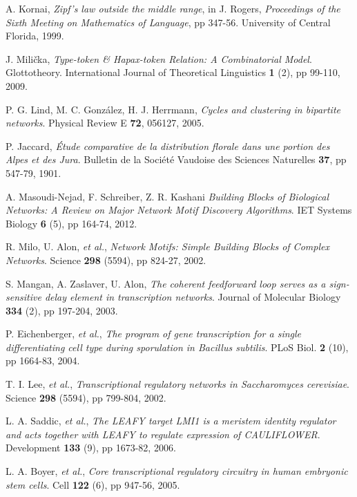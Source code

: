 \begin{thebibliography}{99}
  A. Kornai,
  \emph{Zipf's law outside the middle range}, in J. Rogers, \emph{Proceedings of the Sixth Meeting on Mathematics of Language}, pp 347-56.
  University of Central Florida,
  1999.

  J. Milička,
  \emph{Type-token \& Hapax-token Relation: A Combinatorial Model}.
  Glottotheory. International Journal of Theoretical Linguistics \textbf{1} (2), pp 99-110,
  2009.

  P. G. Lind, M. C. González, H. J. Herrmann,
  \emph{Cycles and clustering in bipartite networks}.
  Physical Review E \textbf{72}, 056127,
  2005.

  P. Jaccard,
  \emph{Étude comparative de la distribution florale dans une portion des Alpes et des Jura}.
  Bulletin de la Société Vaudoise des Sciences Naturelles \textbf{37}, pp 547-79,
  1901.

  A. Masoudi-Nejad, F. Schreiber, Z. R. Kashani
  \emph{Building Blocks of Biological Networks: A Review on Major Network Motif Discovery Algorithms}.
  IET Systems Biology \textbf{6} (5), pp 164-74,
  2012.

  R. Milo, U. Alon, \textit{et al.},
  \emph{Network Motifs: Simple Building Blocks of Complex Networks}.
  Science \textbf{298} (5594), pp 824-27,
  2002.

  S. Mangan, A. Zaslaver, U. Alon,
  \emph{The coherent feedforward loop serves as a sign-sensitive delay element in transcription networks}.
  Journal of Molecular Biology \textbf{334} (2), pp 197-204,
  2003.

  P. Eichenberger, \textit{et al.},
  \emph{The program of gene transcription for a single differentiating cell type during sporulation in Bacillus subtilis}.
  PLoS Biol. \textbf{2} (10), pp 1664-83,
  2004.

  T. I. Lee, \textit{et al.},
  \emph{Transcriptional regulatory networks in Saccharomyces cerevisiae}.
  Science \textbf{298} (5594), pp 799-804,
  2002.

  L. A. Saddic, \textit{et al.},
  \emph{The LEAFY target LMI1 is a meristem identity regulator and acts together with LEAFY to regulate expression of CAULIFLOWER}.
  Development \textbf{133} (9), pp 1673-82,
  2006.

  L. A. Boyer, \textit{et al.},
  \emph{Core transcriptional regulatory circuitry in human embryonic stem cells}.
  Cell \textbf{122} (6), pp 947-56,
  2005.


\end{thebibliography}
